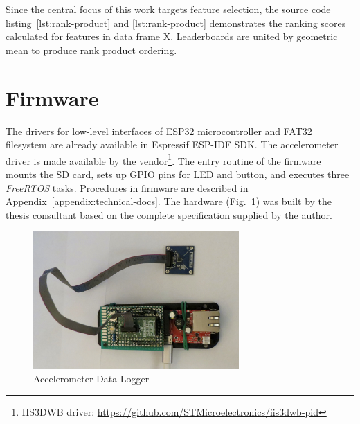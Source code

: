 Since the central focus of this work targets feature selection, the source code listing~\ref{lst:rank-product} and \ref{lst:rank-product} demonstrates the ranking scores calculated for features in data frame X. Leaderboards are united by geometric mean to produce rank product ordering.

\section{Firmware}
The drivers for low-level interfaces of ESP32 microcontroller and FAT32 filesystem are already available in Espressif ESP-IDF SDK. The accelerometer driver is made available by the vendor\footnote{IIS3DWB driver: \url{https://github.com/STMicroelectronics/iis3dwb-pid}}. The entry routine of the firmware mounts the SD card, sets up GPIO pins for LED and button, and executes three \emph{FreeRTOS} tasks. Procedures in firmware are described in Appendix~\ref{appendix:technical-docs}. The hardware (Fig.~\ref{fig:hw-data-logger}) was built by the thesis consultant based on the complete specification supplied by the author.

\begin{figure}[h]
    \centering
    \includegraphics[width=0.7\textwidth]{assets/design/sensor/data-logger.jpg}
    \caption{Accelerometer Data Logger}
    \label{fig:hw-data-logger}
\end{figure}

